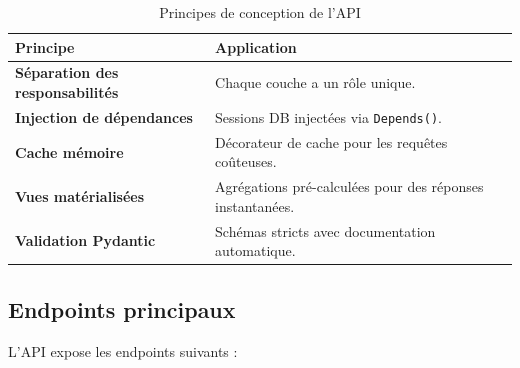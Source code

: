 \documentclass[12pt,a4paper,twoside]{report}
\begin{document}
\begin{table}[H]
\centering
{}
\begin{tabularx}{\textwidth}{>{\bfseries}p{3cm}X}
\toprule
\rowcolor{TableHeader}
\color{white}Principe & \color{white}Application \\
\midrule
Séparation des responsabilités & Chaque couche a un rôle unique. \\
Injection de dépendances & Sessions DB injectées via \texttt{Depends()}. \\
Cache mémoire & Décorateur de cache pour les requêtes coûteuses. \\
Vues matérialisées & Agrégations pré-calculées pour des réponses instantanées. \\
Validation Pydantic & Schémas stricts avec documentation automatique. \\
\bottomrule
\end{tabularx}
\caption{Principes de conception de l'API}
\label{tab:api-principles}
\end{table}

\subsection{Endpoints principaux}

L'API expose les endpoints suivants :
\end{document}
